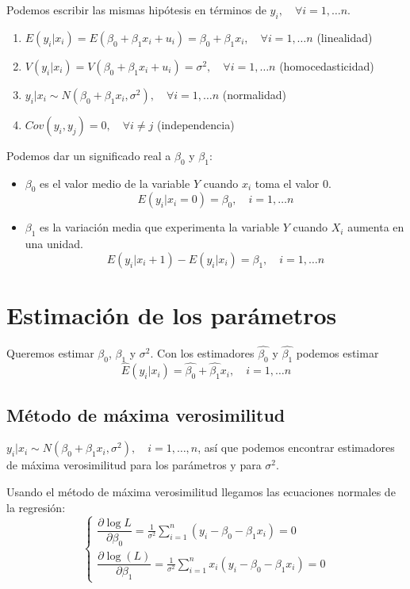 \documentclass{report}
\theoremstyle{remark}
\theoremstyle{remark}
\theoremstyle{remark}
\theoremstyle{definition}
\theoremstyle{definition}
\theoremstyle{definition}
\begin{document}
Podemos escribir las mismas hipótesis en términos de $y_i, \quad \forall i = 1, \dots n$.
\begin{enumerate}
    \item $E(y_i | x_i) = E(\beta_0 + \beta_1x_i + u_i) = \beta_0 + \beta_1x_i, \quad \forall i = 1, \dots n$ (linealidad)
    \item $V(y_i | x_i) = V(\beta_0 + \beta_1x_i + u_i) = \sigma^2, \quad \forall i = 1, \dots n$ (homocedasticidad)
    \item $y_i | x_i \sim N(\beta_0 + \beta_1x_i, \sigma^2), \quad \forall i = 1, \dots n$ (normalidad)
    \item $Cov(y_i, y_j) = 0, \quad \forall i \neq j$ (independencia)
\end{enumerate}

Podemos dar un significado real a $\beta_0$ y $\beta_1$:
\begin{itemize}
    \item $\beta_0$ es el valor medio de la variable $Y$ cuando $x_i$ toma el valor 0.
          $$E(y_i | x_i = 0) = \beta_0, \quad i = 1, \dots n$$
    \item $\beta_1$ es la variación media que experimenta la variable $Y$ cuando $X_i$ aumenta en una unidad.
          $$E(y_i | x_i+1) - E(y_i | x_i) = \beta_1, \quad i = 1, \dots n$$
\end{itemize}

\section{Estimación de los parámetros}
Queremos estimar $\beta_0$, $\beta_1$ y $\sigma^2$.
Con los estimadores $\hat{\beta_0}$ y $\hat{\beta_1}$ podemos estimar $$\hat{E}(y_i | x_i) = \hat{\beta_0} + \hat{\beta_1}x_i, \quad i = 1, \dots n$$

\subsection*{Método de máxima verosimilitud}
$y_i | x_i \sim N(\beta_0 + \beta_1x_i, \sigma^2), \quad i = 1, \dots, n$, así que podemos encontrar estimadores de máxima verosimilitud para los parámetros y para $\sigma^2$.

Usando el método de máxima verosimilitud llegamos las ecuaciones normales de la regresión:
$$\begin{cases}
        \dfrac{\partial \log{L}}{\partial \beta_0} = \frac{1}{\sigma^2} \sum_{i=1}^n (y_i - \beta_0 - \beta_1x_i) = 0 \\
        \dfrac{\partial \log(L)}{\partial \beta_1} = \frac{1}{\sigma^2} \sum_{i=1}^n x_i(y_i - \beta_0 - \beta_1x_i) = 0
    \end{cases}$$
\end{document}
